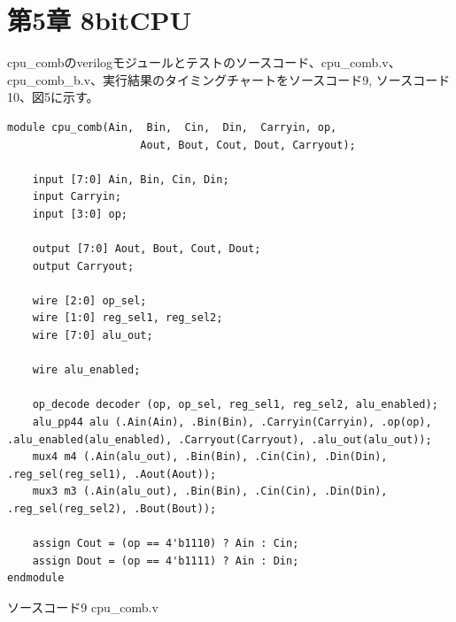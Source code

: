 \documentclass[12pt]{jreport}
\begin{document}
    \chapter*{第5章 8bitCPU}
        cpu_combのverilogモジュールとテストのソースコード、cpu_comb.v、cpu_comb_b.v、実行結果のタイミングチャートをソースコード9, ソースコード10、図5に示す。

        \begin{center}
            \begin{lstlisting}
module cpu_comb(Ain,  Bin,  Cin,  Din,  Carryin, op,
                     Aout, Bout, Cout, Dout, Carryout);
    
    input [7:0] Ain, Bin, Cin, Din;
    input Carryin;
    input [3:0] op;
    
    output [7:0] Aout, Bout, Cout, Dout;
    output Carryout;

    wire [2:0] op_sel;
    wire [1:0] reg_sel1, reg_sel2;
    wire [7:0] alu_out;

    wire alu_enabled;

    op_decode decoder (op, op_sel, reg_sel1, reg_sel2, alu_enabled);
    alu_pp44 alu (.Ain(Ain), .Bin(Bin), .Carryin(Carryin), .op(op), .alu_enabled(alu_enabled), .Carryout(Carryout), .alu_out(alu_out));
    mux4 m4 (.Ain(alu_out), .Bin(Bin), .Cin(Cin), .Din(Din), .reg_sel(reg_sel1), .Aout(Aout));
    mux3 m3 (.Ain(alu_out), .Bin(Bin), .Cin(Cin), .Din(Din), .reg_sel(reg_sel2), .Bout(Bout));
    
    assign Cout = (op == 4'b1110) ? Ain : Cin;
    assign Dout = (op == 4'b1111) ? Ain : Din;
endmodule
            \end{lstlisting}
            ソースコード9 cpu\_comb.v
        \end{center}
    
\end{document}
